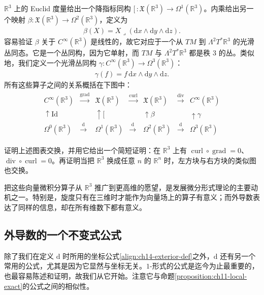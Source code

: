 \documentclass[../../main.tex]{subfiles}
\begin{document}
$\mathbb{R}^3$ 上的 Euclid 度量给出一个降指标同构 $[\,:\mathfrak X(\mathbb{R}^3)\to\Omega^1(\mathbb{R}^3)$。内乘给出另一个映射 $\beta:\mathfrak X(\mathbb{R}^3)\to\Omega^2(\mathbb{R}^3)$，定义为
\begin{align}
\beta(X)=X\lrcorner(\mathrm{d}x\wedge\mathrm{d}y\wedge\mathrm{d}z).\label{align:ch14-beta}
\end{align}
容易验证 $\beta$ 关于 $C^\infty(\mathbb{R}^3)$ 是线性的，故它对应于一个从 $TM$ 到 $\Lambda^2T^*\mathbb{R}^3$ 的光滑丛同态。它是一个丛同构，因为它单射，而 $TM$ 与 $\Lambda^2T^*\mathbb{R}^3$ 都是秩 $3$ 的丛。类似地，我们定义一个光滑丛同构 $\gamma:C^\infty(\mathbb{R}^3)\to\Omega^3(\mathbb{R}^3)$：
\begin{align}
\gamma(f)=f\,\mathrm{d}x\wedge\mathrm{d}y\wedge\mathrm{d}z.\label{align:ch14-gamma}
\end{align}
所有这些算子之间的关系概括在下图中：
\begin{align*}
\begin{array}{ccccccc}
C^\infty(\mathbb{R}^3)&\xrightarrow{\operatorname{grad}}&\mathfrak X(\mathbb{R}^3)&\xrightarrow{\operatorname{curl}}&\mathfrak X(\mathbb{R}^3)&\xrightarrow{\operatorname{div}}&C^\infty(\mathbb{R}^3)\\
\uparrow\mathrm{Id}&&\uparrow[\,&&\uparrow\beta&&\uparrow\gamma\\
\Omega^0(\mathbb{R}^3)&\xrightarrow{\mathrm{d}}&\Omega^1(\mathbb{R}^3)&\xrightarrow{\mathrm{d}}&\Omega^2(\mathbb{R}^3)&\xrightarrow{\mathrm{d}}&\Omega^3(\mathbb{R}^3)
\end{array}
\end{align*}

\begin{exercise}\label{exercise:ch14-28}
证明上述图表交换，并用它给出一个简短证明：在 $\mathbb{R}^3$ 上有 $\operatorname{curl}\circ\operatorname{grad}=0$、$\operatorname{div}\circ\operatorname{curl}=0$。再证明当把 $\mathbb{R}^3$ 换成任意 $n$ 的 $\mathbb{R}^n$ 时，左方块与右方块的类似图也交换。
\end{exercise}

把这些向量微积分算子从 $\mathbb{R}^3$ 推广到更高维的愿望，是发展微分形式理论的主要动机之一。特别是，旋度只有在三维时才能作为向量场上的算子有意义；而外导数表达了同样的信息，却在所有维数下都有意义。

\subsection{外导数的一个不变式公式}

除了我们在定义 $\mathrm{d}$ 时所用的坐标公式\eqref{align:ch14-exterior-def}之外，$\mathrm{d}$ 还有另一个常用的公式，尤其是因为它显然与坐标无关。$1$-形式的公式是迄今为止最重要的，也最容易陈述和证明，故我们从它开始。注意它与命题\ref{proposition:ch11-local-exact}的公式之间的相似性。
\end{document}
